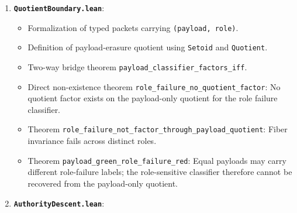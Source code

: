 \documentclass[
  10pt,
]{article}
\providecommand{\tightlist}{%
  \setlength{\itemsep}{0pt}\setlength{\parskip}{0pt}}
\providecommand{\tightlist}{%
  \setlength{\itemsep}{0pt}\setlength{\parskip}{0pt}}
\begin{document}
\begin{enumerate}
  \begin{itemize}
  \tightlist
  \item
    Proposal structure and \texttt{AuthorityToken} with replay custody.
  \item
    Terminal constructors: \texttt{authority}, \texttt{residualClosed}, \texttt{residualOpen}, \texttt{refusal}, \texttt{budgetUnknown}.
  \item
    Terminal constructor disjointness: \texttt{authority\_not\_residual}, \texttt{authority\_not\_refusal}, \texttt{residual\_not\_refusal}.
  \item
    Formal dependent type \texttt{Auth(p)} requiring valid, replayable tokens.
  \item
    Non-authority theorems for residual, refusal, and unreplayable tokens.
  \item
    Cohomological defect classification and the \texttt{non\_exact\_residual\_not\_resolved} and \texttt{renamed\_non\_exact\_as\_resolved\_contradiction} theorems.
  \end{itemize}
\item
  \textbf{\texttt{QuotientBoundary.lean}}:

  \begin{itemize}
  \tightlist
  \item
    Formalization of typed packets carrying \texttt{(payload,\ role)}.
  \item
    Definition of payload-erasure quotient using \texttt{Setoid} and \texttt{Quotient}.
  \item
    Two-way bridge theorem \texttt{payload\_classifier\_factors\_iff}.
  \item
    Direct non-existence theorem \texttt{role\_failure\_no\_quotient\_factor}: No quotient factor exists on the payload-only quotient for the role failure classifier.
  \item
    Theorem \texttt{role\_failure\_not\_factor\_through\_payload\_quotient}: Fiber invariance fails across distinct roles.
  \item
    Theorem \texttt{payload\_green\_role\_failure\_red}: Equal payloads may carry different role-failure labels; the role-sensitive classifier therefore cannot be recovered from the payload-only quotient.
  \end{itemize}
\item
  \textbf{\texttt{AuthorityDescent.lean}}:


\end{enumerate}
\end{document}
